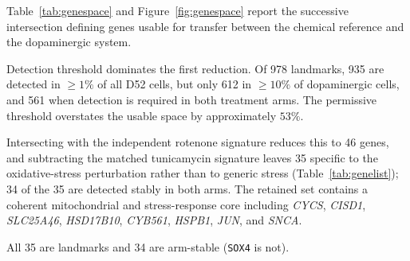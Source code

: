 \documentclass[5p,times,twocolumn]{elsarticle}
\begin{document}
Table~\ref{tab:genespace} and Figure~\ref{fig:genespace} report the successive
intersection defining genes usable for transfer between the chemical reference
and the dopaminergic system.

Detection threshold dominates the first reduction. Of 978 landmarks, 935 are
detected in $\geq 1\%$ of all D52 cells, but only 612 in $\geq 10\%$ of
dopaminergic cells, and 561 when detection is required in both treatment arms.
The permissive threshold overstates the usable space by approximately $53\%$.

Intersecting with the independent rotenone signature reduces this to 46 genes,
and subtracting the matched tunicamycin signature leaves 35 specific to the
oxidative-stress perturbation rather than to generic stress
(Table~\ref{tab:genelist}); 34 of the 35 are detected stably in both arms. The
retained set contains a coherent mitochondrial and stress-response core
including \textit{CYCS}, \textit{CISD1}, \textit{SLC25A46}, \textit{HSD17B10},
\textit{CYB561}, \textit{HSPB1}, \textit{JUN}, and \textit{SNCA}.

\begin{table}[!htbp]
  \centering
  \caption{The 35 rotenone-specific transferable genes: LINCS landmarks, detected in $\geq 10\%$ of DA-labelled D52 cells, differentially expressed under rotenone, and absent from the tunicamycin signature.}
  \label{tab:genelist}
  \begin{minipage}{\linewidth}\footnotesize
  All 35 are landmarks and 34 are arm-stable (\texttt{SOX4} is not).
  \end{minipage}
\end{table}
\end{document}
